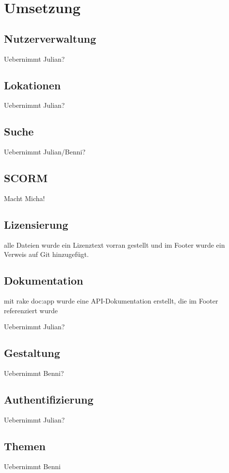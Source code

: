 \chapter{Umsetzung}\label{ref:chaptImplementation}

\section{Nutzerverwaltung}
\begin{k}
Uebernimmt Julian?
\end{k}

\section{Lokationen}
\begin{k}
Uebernimmt Julian?
\end{k}

\section{Suche}
\begin{k}
Uebernimmt Julian/Benni?
\end{k}

\section{SCORM}
\begin{k}
Macht Micha!
\end{k}

\section{Lizensierung}
\begin{k}
alle Dateien wurde ein Lizenztext vorran gestellt und im Footer wurde ein
Verweis auf Git hinzugefügt.
\end{k}

\section{Dokumentation}
\begin{k}
mit rake doc:app wurde eine API-Dokumentation erstellt, die im Footer
referenziert wurde

Uebernimmt Julian?
\end{k}

\section{Gestaltung}
\begin{k}
Uebernimmt Benni?
\end{k}

\section{Authentifizierung}
\begin{k}
Uebernimmt Julian?
\end{k}

\section{Themen}
\begin{k}
Uebernimmt Benni
\end{k}